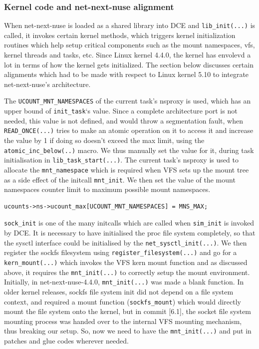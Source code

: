 \documentclass{sig-alternate}
\begin{document}
\subsubsection{Kernel code and net-next-nuse alignment}
When net-next-nuse is loaded as a shared library into DCE and \texttt{lib\_init(...)} is called, it invokes certain kernel methods, which triggers 
kernel initialization routines which help setup critical components such as the mount namespaces, vfs, kernel threads and tasks, etc. 
Since Linux kernel 4.4.0, the
kernel has envolevd a lot in terms of how the kernel gets initialized. The section below discusses certain alignments which had to be made with respect to 
Linux kernel 5.10 to integrate net-next-nuse's architecture.

The \texttt{UCOUNT\_MNT\_NAMESPACES} of the current task’s nsproxy is used, which has an upper bound of \texttt{init\_task}‘s value.  Since
a complete architecture port is not needed, this value is not defined, and
would throw a segmentation fault, when \texttt{READ\_ONCE(...)} tries to make
an atomic operation on it to access it and increase the value by 1 if doing so doesn’t exceed the max limit, using the \texttt{atomic\_inc\_below(..)} macro.
We thus manually set the value for it, during task initialisation in \texttt{lib\_task\_start(...)}. The current task's nsproxy is used to allocate the 
\texttt{mnt\_namespace} which is required when VFS sets up the mount tree as a side effect of the initcall \texttt{mnt\_init}. We then set the value of the 
mount namespaces counter  limit to maximum possible mount namespaces.

\begin{lstlisting}[style=CStyle]
ucounts->ns->ucount_max[UCOUNT_MNT_NAMESPACES] = MNS_MAX;
\end{lstlisting}

\sloppy\texttt{sock\_init} is one of the many initcalls which are called when 
\texttt{sim\_init} is invoked by DCE. It is necessary to have initialised the proc file system completely,
so that the sysctl interface could be initialised by the \texttt{net\_sysctl\_init(...)}. We then register the sockfs filesystem using \texttt{register\_filesystem(...)} 
and go for a \texttt{kern\_mount(...)} which invokes the VFS kern mount function and as discussed above, it requires the \texttt{mnt\_init(...)} to correctly setup 
the mount environment. Initially, in net-next-nuse-4.4.0, \texttt{mnt\_init(...)}  was made a blank function.
In older kernel releases, sockfs file system init did not depend on a file system context, and required a mount function (\texttt{sockfs\_mount}) which
would directly mount the file system onto the kernel, but in commit [6.1], the socket file system mounting process was handed over to the
internal VFS mounting mechanism, thus breaking our setup. So, now we need to have the \texttt{mnt\_init(...)} and put in patches and glue codes wherever
needed.
\end{document}
